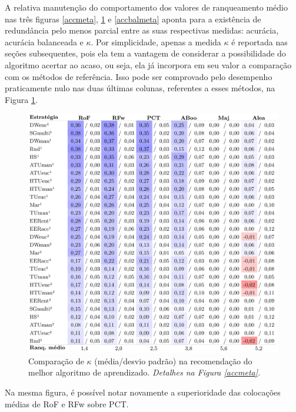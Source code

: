 A relativa manutenção do comportamento dos valores de ranqueamento médio nas três figuras \ref{accmeta}, \ref{kappameta} e \ref{accbalmeta} aponta para a existência de redundância pelo menos parcial entre as suas respectivas medidas: acurácia, acurácia balanceada e $\kappa$.
Por simplicidade, apenas a medida $\kappa$ é reportada nas seções subsequentes, pois ela tem a vantagem de considerar a possibilidade do algoritmo acertar ao acaso, ou seja, ela já incorpora em seu valor a comparação com os métodos de referência.
Isso pode ser comprovado pelo desempenho praticamente nulo nas duas últimas colunas, referentes a esses métodos, na Figura \ref{kappameta}.
\begin{figure}
\centering
\includegraphics[scale=0.4]{images/metakap.pdf}
\caption[Comparação de $\kappa$ na recomendação do melhor algoritmo de aprendizado.]{Comparação de $\kappa$ (média/desvio padrão) na recomendação do melhor algoritmo de aprendizado.
\textit{Detalhes na Figura \ref{accmeta}.}}
\label{kappameta}
\end{figure}
Na mesma figura, é possível notar novamente a superioridade das colocações médias de RoF e RFw sobre PCT.


